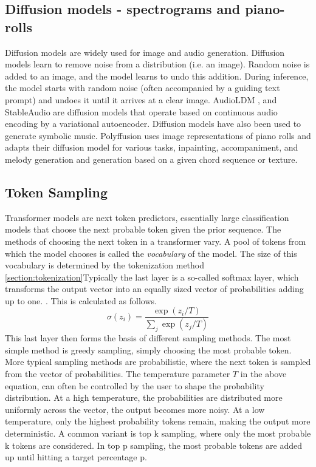 \subsection{Diffusion models - spectrograms and piano-rolls}
Diffusion models are widely used for image and audio generation. Diffusion models learn to remove noise from a distribution (i.e. an image). Random noise is added to an image, and the model learns to undo this addition. During inference, the model starts with random noise (often accompanied by a guiding text prompt) and undoes it until it arrives at a clear image. AudioLDM \cite{Liu_Chen_Yuan_Mei_Liu_Mandic_Wang_Plumbley_2023}, and StableAudio \cite{Evans_Parker_Carr_Zukowski_Taylor_Pons_2024} are diffusion models that operate based on continuous audio encoding by a variational autoencoder. Diffusion models have also been used to generate symbolic music. Polyffusion \cite{Min_Jiang_Xia_Zhao_polyffusion_2023} uses image representations of piano rolls and adapts their diffusion model for various tasks, inpainting, accompaniment, and melody generation and generation based on a given chord sequence or texture. 

\subsection{Token Sampling} \label{section:token_sampling}
Transformer models are next token predictors, essentially large classification models that choose the next probable token given the prior sequence. The methods of choosing the next token in a transformer vary. A pool of tokens from which the model chooses is called the \textit{vocabulary} of the model. The size of this vocabulary is determined by the tokenization method \ref{section:tokenization}Typically the last layer is a so-called softmax layer, which transforms the output vector into an equally sized vector of probabilities adding up to one. \cite{Radford_Wu_Child_Luan_gpt2_2019}. This is calculated as follows. 
\begin{equation}
\sigma(z_i) = \frac{\exp(z_i / T)}{\sum_{j} \exp(z_j / T)}
\end{equation}
This last layer then forms the basis of different sampling methods. The most simple method is greedy sampling, simply choosing the most probable token. More typical sampling methods are probabilistic, where the next token is sampled from the vector of probabilities. The temperature parameter $T$ in the above equation, can often be controlled by the user to shape the probability distribution. At a high temperature, the probabilities are distributed more uniformly across the vector, the output becomes more noisy. At a low temperature, only the highest probability tokens remain, making the output more deterministic. 
A common variant is top k sampling, where only the most probable k tokens are considered. In top p sampling, the most probable tokens are added up until hitting a target percentage p. 


